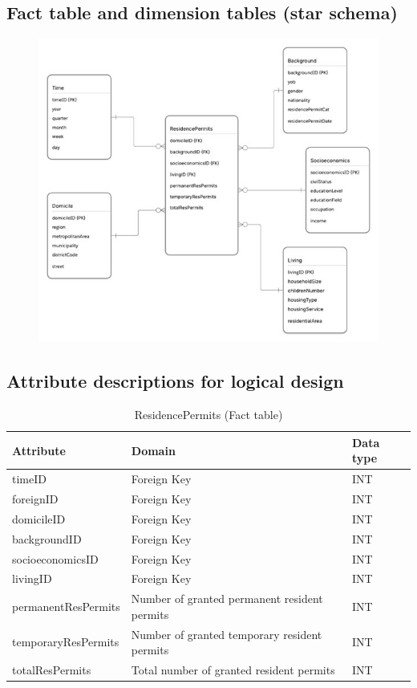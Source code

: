 \subsection{Fact table and dimension tables (star schema)}
\begin{figure}[h] %
  \centering
  \includegraphics[width=1.0\textwidth]{Figures/Q4_StarSchema.jpg}
  \label{fig:my_image}
\end{figure}
\subsection{Attribute descriptions for logical design}
\begin{table}[htbp]
  \centering
  \caption{ResidencePermits (Fact table)}
  \begin{tabular}{|l|l|l|}
    \hline
    \textbf{Attribute} & \textbf{Domain} & \textbf{Data type} \\
    \hline
    timeID & Foreign Key & INT \\
    \hline
    foreignID & Foreign Key & INT \\
    \hline
    domicileID & Foreign Key & INT \\
    \hline
    backgroundID & Foreign Key & INT \\
    \hline
    socioeconomicsID & Foreign Key & INT \\
    \hline
    livingID & Foreign Key & INT \\
    \hline
    permanentResPermits & Number of granted permanent resident permits & INT \\
    \hline
    temporaryResPermits & Number of granted temporary resident permits & INT \\
    \hline
    totalResPermits & Total number of granted resident permits & INT \\
    \hline
  \end{tabular}
\end{table}

